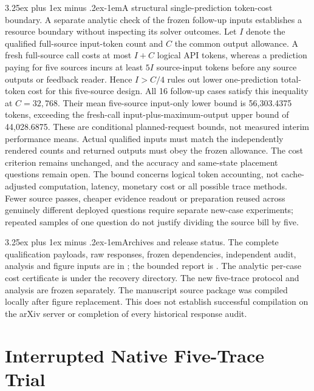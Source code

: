 \documentclass[10pt]{article}
\makeatletter
\renewcommand\paragraph{\@startsection{paragraph}{4}{\parindent}%
  {3.25ex plus 1ex minus .2ex}{-1em}{\normalfont\normalsize\bfseries}}
\makeatother
\begin{document}
\paragraph{A structural single-prediction token-cost boundary.} A separate analytic check of the frozen follow-up inputs establishes a resource boundary without inspecting its solver outcomes. Let $I$ denote the qualified full-source input-token count and $C$ the common output allowance. A fresh full-source call costs at most $I+C$ logical API tokens, whereas a prediction paying for five sources incurs at least $5I$ source-input tokens before any source outputs or feedback reader. Hence $I>C/4$ rules out lower one-prediction total-token cost for this five-source design. All 16 follow-up cases satisfy this inequality at $C=32{,}768$. Their mean five-source input-only lower bound is 56,303.4375 tokens, exceeding the fresh-call input-plus-maximum-output upper bound of 44,028.6875. These are conditional planned-request bounds, not measured interim performance means. Actual qualified inputs must match the independently rendered counts and returned outputs must obey the frozen allowance. The cost criterion remains unchanged, and the accuracy and same-state placement questions remain open. The bound concerns logical token accounting, not cache-adjusted computation, latency, monetary cost or all possible trace methods. Fewer source passes, cheaper evidence readout or preparation reused across genuinely different deployed questions require separate new-case experiments; repeated samples of one question do not justify dividing the source bill by five.

\paragraph{Archives and release status.} The complete qualification payloads, raw responses, frozen dependencies, independent audit, analysis and figure inputs are in \protect{}; the bounded report is \protect{}. The analytic per-case cost certificate is \protect{} under the recovery directory. The new five-trace protocol and analysis are frozen separately. The manuscript source package was compiled locally after figure replacement. This does not establish successful compilation on the arXiv server or completion of every historical response audit.

\section{Interrupted Native Five-Trace Trial}
\label{app:hybrid-interrupted}
\end{document}

